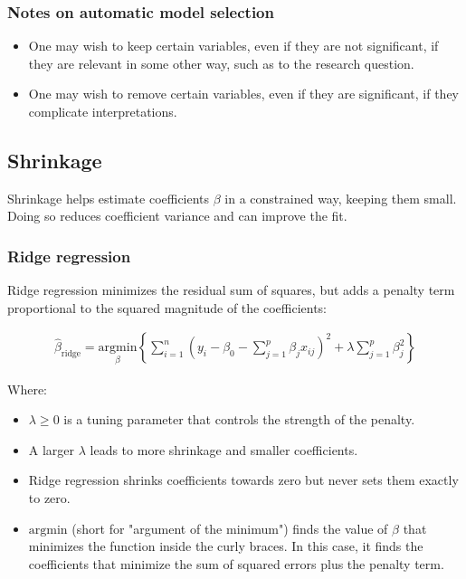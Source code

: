 \documentclass{article}
\begin{document}
\subsubsection{Notes on automatic model selection}

\begin{itemize}
    \item One may wish to keep certain variables, even if they are not significant, if they are relevant in some other way, such as to the research question.
    \item One may wish to remove certain variables, even if they are significant, if they complicate interpretations.
\end{itemize}

\subsection{Shrinkage}

Shrinkage helps estimate coefficients $\beta$ in a constrained way, keeping them small. Doing so reduces coefficient variance and can improve the fit.

\subsubsection{Ridge regression}

Ridge regression minimizes the residual sum of squares, but adds a penalty term proportional to the squared magnitude of the coefficients:

\begin{align*}
    \hat{\beta}_\text{ridge} = \underset{\beta}{\mathrm{argmin}} \left\{ \sum_{i=1}^{n} (y_i - \beta_0 - \sum_{j=1}^{p} \beta_j x_{ij})^2 + \lambda \sum_{j=1}^{p} \beta_j^2 \right\}
\end{align*}

Where:
\begin{itemize}
    \item $\lambda \geq 0$ is a tuning parameter that controls the strength of the penalty.
    \item A larger $\lambda$ leads to more shrinkage and smaller coefficients.
    \item Ridge regression shrinks coefficients towards zero but never sets them exactly to zero.
    \item $\text{argmin}$ (short for "argument of the minimum") finds the value of $\beta$ that minimizes the function inside the curly braces. In this case, it finds the coefficients that minimize the sum of squared errors plus the penalty term.
\end{itemize}
\end{document}
